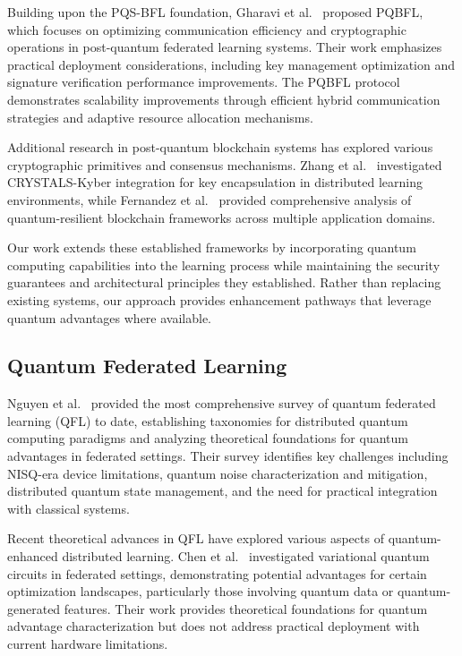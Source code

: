 \documentclass[10pt,journal,compsoc]{IEEEtran}
\begin{document}
Building upon the PQS-BFL foundation, Gharavi et al.~\cite{Gharavi2025} proposed PQBFL, which focuses on optimizing communication efficiency and cryptographic operations in post-quantum federated learning systems. Their work emphasizes practical deployment considerations, including key management optimization and signature verification performance improvements. The PQBFL protocol demonstrates scalability improvements through efficient hybrid communication strategies and adaptive resource allocation mechanisms.

Additional research in post-quantum blockchain systems has explored various cryptographic primitives and consensus mechanisms. Zhang et al.~\cite{Zhang2024} investigated CRYSTALS-Kyber integration for key encapsulation in distributed learning environments, while Fernandez et al.~\cite{Fernandez2024} provided comprehensive analysis of quantum-resilient blockchain frameworks across multiple application domains.

Our work extends these established frameworks by incorporating quantum computing capabilities into the learning process while maintaining the security guarantees and architectural principles they established. Rather than replacing existing systems, our approach provides enhancement pathways that leverage quantum advantages where available.

\subsection{Quantum Federated Learning}

Nguyen et al.~\cite{Nguyen2024} provided the most comprehensive survey of quantum federated learning (QFL) to date, establishing taxonomies for distributed quantum computing paradigms and analyzing theoretical foundations for quantum advantages in federated settings. Their survey identifies key challenges including NISQ-era device limitations, quantum noise characterization and mitigation, distributed quantum state management, and the need for practical integration with classical systems.

Recent theoretical advances in QFL have explored various aspects of quantum-enhanced distributed learning. Chen et al.~\cite{Chen2024} investigated variational quantum circuits in federated settings, demonstrating potential advantages for certain optimization landscapes, particularly those involving quantum data or quantum-generated features. Their work provides theoretical foundations for quantum advantage characterization but does not address practical deployment with current hardware limitations.
\end{document}
